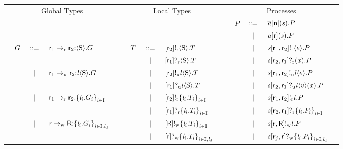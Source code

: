 \begin{figure}[t]
	\centering
	\renewcommand{\tabcolsep}{1pt}
	\begin{tabular}{|llclr|llclr|llclr|}
		\hline
		\multicolumn{5}{|c|}{Global Types} & \multicolumn{5}{c|}{Local Types} & \multicolumn{5}{c|}{Processes}\\
		&&&&& &&&&& & $ P $ & $ \deffTerms $ & $ \PReq{\Chan[a]}{\Role[n]}{\Chan}{P} $ &\\
		&&&&& &&&&& & & $ \sepTerms $ & $ \PAcc{\Chan[a]}{\Role}{\Chan}{P} $ &\\
		& \multirow{2}{*}{$ \GT $} & \multirow{2}{*}{$ \deffTerms $} & \multirow{2}{*}{$ \GComR{\Role_1}{\Role_2}{\Sort}{\GT} $} & & & $ \LT $ & $ \deffTerms $ & $ \LSendR{\Role_2}{\Sort}{\LT} $ & & & & $ \sepTerms $ & $ \PSendR{\Chan}{\Role_1}{\Role_2}{\Expr}{P} $ &\\
		&&&&& & & $ \sepTerms $ & $ \LGetR{\Role_1}{\Sort}{\LT} $ & & & & $ \sepTerms $ & $ \PGetR{\Chan}{\Role_2}{\Role_1}{\Args}{\PT} $ &\\
		& & \multirow{2}{*}{$ \sepTerms $} & \multirow{2}{*}{$ \GComU{\Role_1}{\Role_2}{\Label}{\Sort}{\GT} $} & & & & $ \sepTerms $ & $ \LSendU{\Role_2}{\Label}{\Sort}{\LT} $ & & & & $ \sepTerms $ & $ \PSendU{\Chan}{\Role_1}{\Role_2}{\Label}{\Expr}{P} $ &\\
		&&&&& & & $ \sepTerms $ & $ \LGetU{\Role_1}{\Label}{\Sort}{\LT} $ & & & & $ \sepTerms $ & $ \PGetU{\Chan}{\Role_2}{\Role_1}{\Label}{\Expr[v]}{\Args}{P} $ &\\
		& & \multirow{2}{*}{$ \sepTerms $} & \multirow{2}{*}{$ \GBranR{\Role_1}{\Role_2}{\Set{ \Label_i.\GT_i}_{i \in \indexSet}} $} & & & & $ \sepTerms $ & $ \LSelR{\Role_2}{\Set{ \Label_i.\LT_i }_{i \in \indexSet}} $ & & & & $ \sepTerms $ & $ \PSelR{\Chan}{\Role_1}{\Role_2}{\Label}{P} $ &\\
		&&&&& & & $ \sepTerms $ & $ \LBranR{\Role_1}{\Set{ \Label_i.\LT_i }_{i \in \indexSet}} $ & & & & $ \sepTerms $ & $ \PBranR{\Chan}{\Role_2}{\Role_1}{\Set{ \Label_i.P_i }_{i \in \indexSet}} $ &\\
		& & \multirow{2}{*}{$ \sepTerms $} & \multirow{2}{*}{$ \GBranW{\Role}{\Role[R]}{\Set{ \Label_i.\GT_i }_{i \in \indexSet, \LabelD}} $} & & & & $ \sepTerms $ & $ \LSelW{\Role[R]}{\Set{ \Label_i.\LT_i }_{i \in \indexSet}} $ & & & & $ \sepTerms $ & $ \PSelW{\Chan}{\Role}{\Role[R]}{\Label}{P} $ &\\
		&&&&& & & $ \sepTerms $ & $ \LBranW{\Role}{\Set{ \Label_i.\LT_i }_{i \in \indexSet, \LabelD}} $ & & & & $ \sepTerms $ & $ \PBranW{\Chan}{\Role_j}{\Role}{\Set{ \Label_i.P_i }_{i \in \indexSet, \LabelD}} $ &\\

\end{tabular}
\end{figure}
